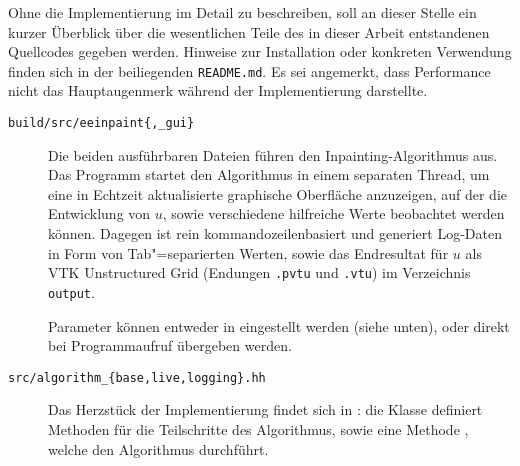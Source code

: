 \documentclass{mythesis}
\begin{document}
Ohne die Implementierung im Detail zu beschreiben, soll an dieser Stelle ein kurzer Überblick über die wesentlichen Teile des in dieser Arbeit entstandenen Quellcodes gegeben werden.
Hinweise zur Installation oder konkreten Verwendung finden sich in der beiliegenden \texttt{README.md}.
Es sei angemerkt, dass Performance nicht das Hauptaugenmerk während der Implementierung darstellte.

\begin{description}
    \item[\texttt{build/src/eeinpaint\{,_gui\}}]
	Die beiden ausführbaren Dateien führen den Inpainting-Algorithmus aus.
 	Das Programm  startet den Algorithmus in einem separaten Thread, um eine in Echtzeit aktualisierte graphische Oberfläche anzuzeigen, auf der die Entwicklung von $u$, sowie verschiedene hilfreiche Werte beobachtet werden können.
	Dagegen ist  rein kommandozeilenbasiert und generiert Log-Daten in Form von Tab"=separierten Werten, sowie das Endresultat für $u$ als VTK Unstructured Grid (Endungen \texttt{.pvtu} und \texttt{.vtu}) im Verzeichnis \texttt{output}.

	Parameter können entweder in  eingestellt werden (siehe unten), oder direkt bei Programmaufruf übergeben werden.
    \item[\texttt{src/algorithm_\{base,live,logging\}.hh}]
	Das Herzstück der Implementierung findet sich in : die Klasse  definiert Methoden für die Teilschritte des Algorithmus, sowie eine Methode , welche den Algorithmus durchführt.


\end{description}
\end{document}
